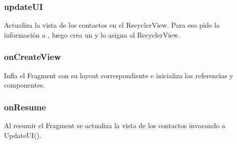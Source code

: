 \documentclass[letterpaper,10pt,english]{sphinxmanual}
\begin{document}
\subsubsection{updateUI}
\label{Fragments/ContactsFragment:id1}

\begin{fulllineitems}
\label{Fragments/ContactsFragment:com.fiuba.tallerii.jobify.ContactsFragment.updateUI()}
Actualiza la vista de los contactos en el RecyclerView. Para eso pide la información a , luego crea un  y lo asigna al RecyclerView.

\end{fulllineitems}



\subsubsection{onCreateView}
\label{Fragments/ContactsFragment:oncreateview}

\begin{fulllineitems}
\label{Fragments/ContactsFragment:com.fiuba.tallerii.jobify.ContactsFragment.onCreateView(LayoutInflater, ViewGroup, Bundle)}
Infla el Fragment con su layout correspondiente e inicializa las referencias y componentes.

\end{fulllineitems}



\subsubsection{onResume}
\label{Fragments/ContactsFragment:onresume}

\begin{fulllineitems}
\label{Fragments/ContactsFragment:com.fiuba.tallerii.jobify.ContactsFragment.onResume()}
Al resumir el Fragment se actualiza la vista de los contactos invocando a UpdateUI().

\end{fulllineitems}
\end{document}
